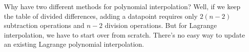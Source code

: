 \begin{ex}
Why have two different methods for polynomial interpolation? Well, if we
keep the table of divided differences, adding a datapoint requires only
$2(n-2)$ subtraction operations and $n-2$ division operations. But for
Lagrange interpolation, we have to start over from scratch. There's no
easy way to update an existing Lagrange polynomial interpolation.
\end{ex}

